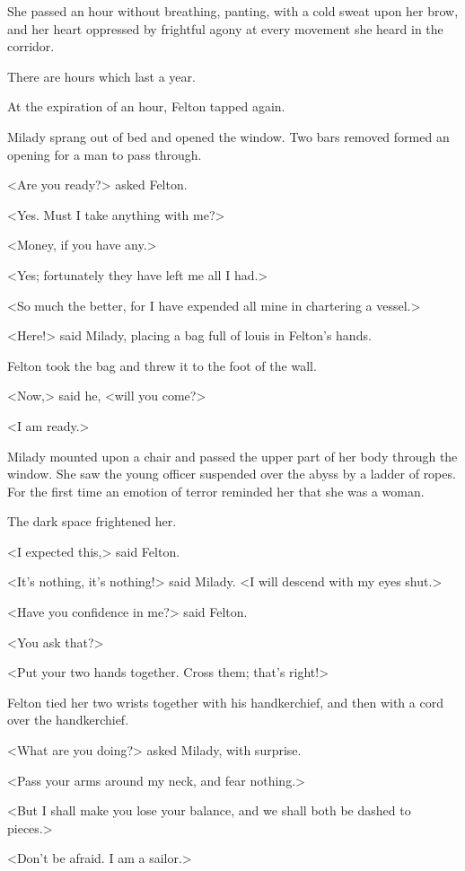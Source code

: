 She passed an hour without breathing, panting, with a cold sweat upon her brow, and her heart oppressed by frightful agony at every movement she heard in the corridor. 

There are hours which last a year. 

At the expiration of an hour, Felton tapped again. 

Milady sprang out of bed and opened the window. Two bars removed formed an opening for a man to pass through. 

<Are you ready?> asked Felton. 

<Yes. Must I take anything with me?> 

<Money, if you have any.> 

<Yes; fortunately they have left me all I had.> 

<So much the better, for I have expended all mine in chartering a vessel.> 

<Here!> said Milady, placing a bag full of louis in Felton's hands. 

Felton took the bag and threw it to the foot of the wall. 

<Now,> said he, <will you come?> 

<I am ready.> 

Milady mounted upon a chair and passed the upper part of her body through the window. She saw the young officer suspended over the abyss by a ladder of ropes. For the first time an emotion of terror reminded her that she was a woman. 

The dark space frightened her. 

<I expected this,> said Felton. 

<It's nothing, it's nothing!> said Milady. <I will descend with my eyes shut.> 

<Have you confidence in me?> said Felton. 

<You ask that?> 

<Put your two hands together. Cross them; that's right!> 

Felton tied her two wrists together with his handkerchief, and then with a cord over the handkerchief. 

<What are you doing?> asked Milady, with surprise. 

<Pass your arms around my neck, and fear nothing.> 

<But I shall make you lose your balance, and we shall both be dashed to pieces.> 

<Don't be afraid. I am a sailor.> 

